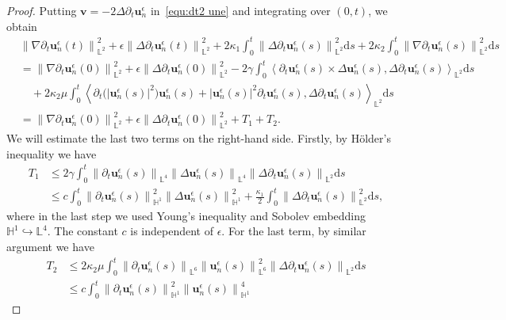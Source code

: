 \documentclass[11pt,reqno]{amsart}
\theoremstyle{definition}
\numberwithin{equation}{section}
\newcommand{\bff}{\boldsymbol}
\newcommand{\bb}{\mathbb}
\newcommand{\ds}{\mathrm{d}s}
\newcommand{\pa}{\partial}
\newcommand{\nn}{\nonumber}
\newcommand{\norm}[2]{\left\|{#1}\right\|_{#2}}
\newcommand{\inpro}[2]{\left\langle#1,#2\right\rangle}
\begin{document}
\begin{proof}
	Putting $\bff{v}=-2\Delta \pa_t \bff{u}_n^\epsilon$ in~\eqref{equ:dt2 une} and integrating over $(0,t)$, we obtain
	\begin{align}\label{equ:nab dt un L2}
		&\norm{\nabla \pa_t \bff{u}_n^\epsilon(t)}{\bb{L}^2}^2
		+
		\epsilon \norm{\Delta \pa_t \bff{u}_n^\epsilon(t)}{\bb{L}^2}^2
		+
		2\kappa_1 \int_0^t \norm{\Delta \pa_t \bff{u}_n^\epsilon(s)}{\bb{L}^2}^2 \ds 
		+
		2\kappa_2 \int_0^t \norm{\nabla \pa_t \bff{u}_n^\epsilon(s)}{\bb{L}^2}^2 \ds 
		\nn \\
		&=
		\norm{\nabla \pa_t \bff{u}_n^\epsilon(0)}{\bb{L}^2}^2
		+
		\epsilon \norm{\Delta \pa_t \bff{u}_n^\epsilon(0)}{\bb{L}^2}^2
		-
		2\gamma \int_0^t \inpro{\pa_t \bff{u}_n^\epsilon(s) \times \Delta \bff{u}_n^\epsilon(s)}{\Delta \pa_t \bff{u}_n^\epsilon(s)}_{\bb{L}^2} \ds 
		\nn \\
		&\quad
		+
		2\kappa_2\mu \int_0^t \inpro{\pa_t \big(|\bff{u}_n^\epsilon(s)|^2\big) \bff{u}_n^\epsilon(s)
			+
			|\bff{u}_n^\epsilon(s)|^2 \pa_t\bff{u}_n^\epsilon(s)}{\Delta \pa_t \bff{u}_n^\epsilon(s)}_{\bb{L}^2} \ds
		\nn\\
		&=
		\norm{\nabla \pa_t \bff{u}_n^\epsilon(0)}{\bb{L}^2}^2
		+
		\epsilon \norm{\Delta \pa_t \bff{u}_n^\epsilon(0)}{\bb{L}^2}^2
		+ T_1 + T_2.
	\end{align}
	We will estimate the last two terms on the right-hand side. Firstly, by H\"older's inequality we have
	\begin{align*}
		T_1
		&\leq
		2\gamma
		\int_0^t \norm{\pa_t \bff{u}_n^\epsilon(s)}{\bb{L}^4} \norm{\Delta \bff{u}_n^\epsilon(s)}{\bb{L}^4} 
		\norm{\Delta \pa_t \bff{u}_n^\epsilon(s)}{\bb{L}^2} \ds 
		\\
		&\leq
		c \int_0^t \norm{\pa_t \bff{u}_n^\epsilon(s)}{\bb{H}^1}^2 \norm{\Delta \bff{u}_n^\epsilon(s)}{\bb{H}^1}^2 
		+
		\frac{\kappa_1}{2} \int_0^t \norm{\Delta \pa_t \bff{u}_n^\epsilon(s)}{\bb{L}^2}^2 \ds,
	\end{align*}
	where in the last step we used Young's inequality and Sobolev embedding $\bb{H}^1\hookrightarrow \bb{L}^4$. The constant $c$ is independent of $\epsilon$. For the last term, by similar argument we have
	\begin{align*}
		T_2
		&\leq
		2\kappa_2 \mu
		\int_0^t \norm{\pa_t \bff{u}_n^\epsilon(s)}{\bb{L}^6}
		\norm{\bff{u}_n^\epsilon(s)}{\bb{L}^6}^2 
		\norm{\Delta \pa_t \bff{u}_n^\epsilon(s)}{\bb{L}^2} \ds 
		\\
		&\leq
		c\int_0^t \norm{\pa_t \bff{u}_n^\epsilon(s)}{\bb{H}^1}^2 \norm{ \bff{u}_n^\epsilon(s)}{\bb{H}^1}^4 

\end{align*}
\end{proof}
\end{document}
